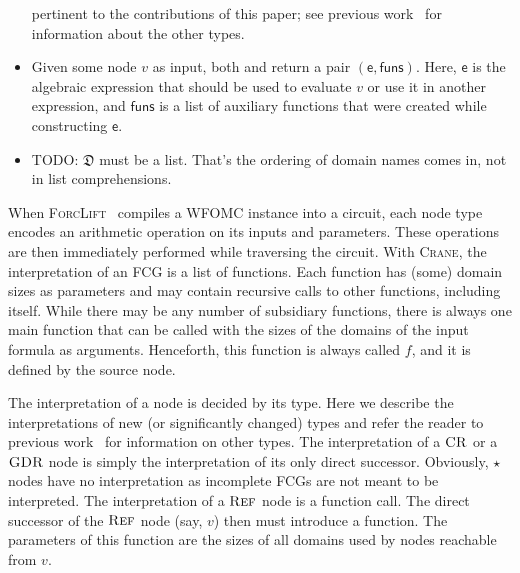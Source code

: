 \documentclass{article}
\theoremstyle{definition}
\DeclareMathOperator{\CR}{\textsc{CR}}
\DeclareMathOperator{\GDR}{\textsc{GDR}}
\DeclareMathOperator{\Reff}{\textsc{Ref}}
\begin{document}
\begin{itemize}
        pertinent to the contributions of this paper; see previous
        work~\cite{DBLP:conf/ijcai/BroeckTMDR11} for information about the other
        types.
  \item Given some node $v$ as input, both \visit and \actuallyVisit return a
        pair $(\mathsf{e}, \mathsf{funs})$. Here, $\mathsf{e}$ is the algebraic
        expression that should be used to evaluate $v$ or use it in another
        expression, and $\mathsf{funs}$ is a list of auxiliary functions that
        were created while constructing $\mathsf{e}$.
  \item TODO: $\mathfrak{D}$ must be a list. That's the ordering of domain names
        comes in, not in list comprehensions.
\end{itemize}

When \textsc{ForcLift}~\cite{DBLP:conf/ijcai/BroeckTMDR11} compiles a WFOMC
instance into a circuit, each node type encodes an arithmetic operation on its
inputs and parameters. These operations are then immediately performed while
traversing the circuit. With \textsc{Crane}, the interpretation of an FCG is a
list of functions. Each function has (some) domain sizes as parameters and may
contain recursive calls to other functions, including itself. While there may be
any number of subsidiary functions, there is always one main function that can
be called with the sizes of the domains of the input formula as arguments.
Henceforth, this function is always called $f$, and it is defined by the source
node.

The interpretation of a node is decided by its type. Here we describe the
interpretations of new (or significantly changed) types and refer the reader to
previous work~\cite{DBLP:conf/ijcai/BroeckTMDR11} for information on other
types. The interpretation of a $\CR$ or a $\GDR$ node is simply the
interpretation of its only direct successor. Obviously, $\star$ nodes have no
interpretation as incomplete FCGs are not meant to be interpreted. The
interpretation of a $\Reff$ node is a function call. The direct successor of the
$\Reff$ node (say, $v$) then must introduce a function. The parameters of this
function are the sizes of all domains used by nodes reachable from $v$.
\end{document}
